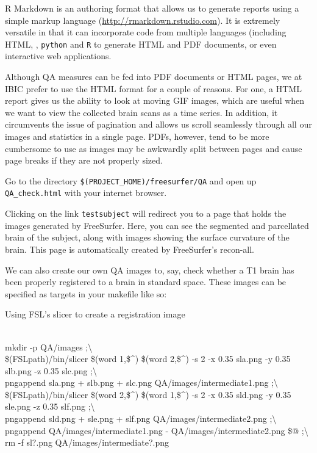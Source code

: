 R Markdown is an authoring format that allows us to generate reports using a simple markup language (\url{http://rmarkdown.rstudio.com}). It is extremely versatile in that it can incorporate code from multiple languages (including HTML, \bashn{}, \texttt{python} and \texttt{R} to generate HTML and PDF documents, or even interactive web applications. 

Although QA measures can be fed into PDF documents or HTML pages, we at IBIC prefer to use the HTML format for a couple of reasons. For one, a HTML report gives us the ability to look at moving GIF images, which are useful when we want to view the collected brain scans as a time series. In addition, it circumvents the issue of pagination and allows us scroll seamlessly through all our images and statistics in a single page. PDFs, however, tend to be more cumbersome to use as images may be awkwardly split between pages and cause page breaks if they are not properly sized.

Go to the directory \texttt{\$(PROJECT_HOME)/freesurfer/QA} and open up \texttt{QA_check.html} with your internet browser. 

Clicking on the link \texttt{testsubject} will redirect you to a page that holds the images generated by FreeSurfer. Here, you can see the segmented and parcellated brain of the subject, along with images showing the surface curvature of the brain. This page is automatically created by FreeSurfer's recon-all.

We can also create our own QA images to, say, check whether a T1 brain has been properly registered to a brain in standard space. These images can be specified as targets in your makefile like so: 
\clearpage
\begin{make}{Using FSL's slicer to create a registration image}{}

 \\
\tab mkdir -p QA/images ;\textbackslash{} \\
\tab\$(FSLpath)/bin/slicer \$(word 1,\$\textasciicircum{}) \$(word 2,\$\textasciicircum{}) -s 2 -x 0.35 sla.png -y 0.35 slb.png -z 0.35 slc.png ;\textbackslash{} \\
\tab pngappend sla.png + slb.png + slc.png QA/images/intermediate1.png ;\textbackslash{} \\
\tab\$(FSLpath)/bin/slicer \$(word 2,\$\textasciicircum{}) \$(word 1,\$\textasciicircum{}) -s 2 -x 0.35 sld.png -y 0.35 sle.png -z 0.35 slf.png ;\textbackslash{} \\
\tab pngappend sld.png + sle.png + slf.png QA/images/intermediate2.png ;\textbackslash{} \\
\tab pngappend QA/images/intermediate1.png - QA/images/intermediate2.png \$@ ;\textbackslash{} \\
\tab rm -f sl?.png QA/images/intermediate?.png
\end{make}


